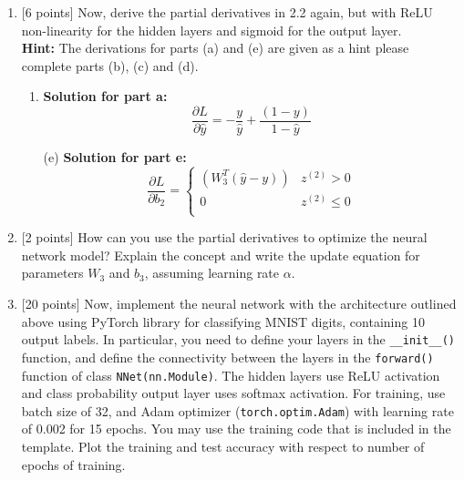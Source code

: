 \documentclass[letterpaper]{article}
\begin{document}
\begin{enumerate}
 
 \item{[6 points]} Now, derive the partial derivatives in 2.2 again, but with ReLU non-linearity for the hidden layers and sigmoid for the output layer.\\
 {\bf Hint:} The derivations for parts (a) and (e) are given as a hint please complete parts (b), (c) and (d).
 \begin{enumerate}
    \item 
    {\bf Solution for part a:} {\color{blue}  $$\frac{\partial{L}}{\partial{\hat{y}}} = -\frac{y}{\hat{y}} + \frac{(1-y)}{1-\hat{y}}$$}
    \item[(e)]
    {\bf Solution for part e:} {\color{blue} $$\frac{\partial{L}}{\partial{b_2}} = 
\begin{cases}
\left(W_3^T (\hat{y} - y) \right) & z^{(2)} > 0\\
0 & z^{(2)} \leq 0\\
\end{cases}
$$}
\end{enumerate}
 
 \item{[2 points]} How can you use the partial derivatives to optimize the neural network model? Explain the concept and write the update equation for parameters $W_3$ and $b_3$, assuming learning rate $\alpha$.

 \item{[20 points]} Now, implement the neural network with the architecture outlined above using PyTorch library for classifying MNIST digits, containing 10 output labels. In particular, you need to define your layers in the \texttt{\_\_init\_\_()} function, and define the connectivity between the layers in the \texttt{forward()} function of class \texttt{NNet(nn.Module)}. The hidden layers use ReLU activation and class probability output layer uses softmax activation.  For training, use batch size of 32, and Adam optimizer (\texttt{torch.optim.Adam}) with learning rate of 0.002 for 15 epochs. You may use the training code that is included in the template. Plot the training and test accuracy with respect to number of epochs of training.

\end{enumerate}
\end{document}
